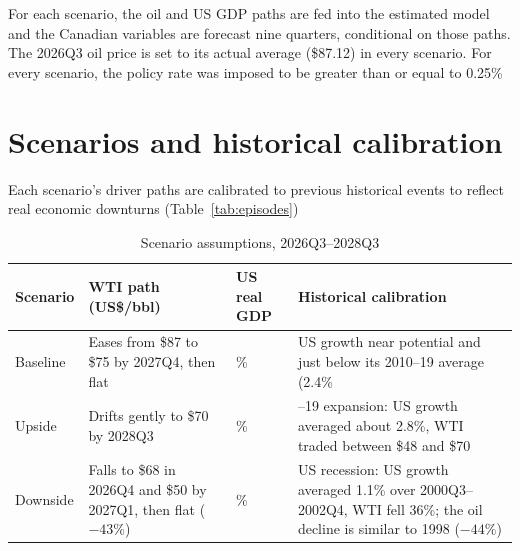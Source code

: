 \documentclass[11pt]{article}
\begin{document}
For each scenario, the oil and US GDP paths are fed into the estimated model and the Canadian variables
are forecast nine quarters, conditional on those paths. The 2026Q3 oil price is set to its actual
average (\$87.12) in every scenario. For every scenario, the policy rate was imposed to be greater than or equal to 0.25\%

\section{Scenarios and historical calibration}

Each scenario's driver paths are calibrated to previous historical events to reflect real economic downturns (Table~\ref{tab:episodes})


\begin{table}[htbp]
\centering
\caption{Scenario assumptions, 2026Q3--2028Q3}
\label{tab:scenarios}
\small
\begin{tabular}{>{\raggedright\arraybackslash}p{1.8cm}>{\raggedright\arraybackslash}p{4.2cm}>{\raggedright\arraybackslash}p{1.9cm}>{\raggedright\arraybackslash}p{5.6cm}}
\toprule
Scenario & WTI path (US\$/bbl) & US real GDP & Historical calibration \\
\midrule
Baseline & Eases from \$87 to \$75 by 2027Q4, then flat & 2.0\% & US growth near potential and just below its 2010--19 average (2.4\% \\[0.3em]
Upside   & Drifts gently to \$70 by 2028Q3 & 3.0\% & 2017--19 expansion: US growth averaged about 2.8\%, WTI traded between \$48 and \$70 \\[0.3em]
Downside & Falls to \$68 in 2026Q4 and \$50 by 2027Q1, then flat ($-43\%$) & 0.5\% & 2001 US recession: US growth averaged 1.1\% over 2000Q3--2002Q4, WTI fell 36\%; the oil decline is similar to 1998 ($-44\%$) \\
\bottomrule
\end{tabular}
\end{table}
\end{document}
